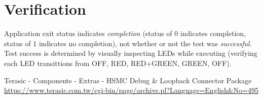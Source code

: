 \section{Verification}
Application exit status indicates \textit{completion} (status of 0 indicates completion, status of 1 indicates no completion), not whether or not the test was \textit{successful}. Test success is determined by visually inspecting LEDs while executing (verifying each LED transittions from OFF, RED, RED+GREEN, GREEN, OFF).

\begin{thebibliography}{1}

 Terasic - Components - Extras - HSMC Debug \& Loopback Connector Package
\url{https://www.terasic.com.tw/cgi-bin/page/archive.pl?Language=English&No=495}

\end{thebibliography}


